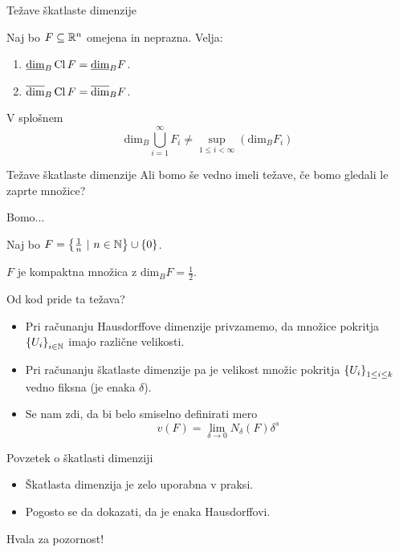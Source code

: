 \documentclass[10pt]{beamer}
\begin{document}
\begin{frame}[t]{Težave škatlaste dimenzije}
    \begin{trditev}
        Naj bo \(F \subseteq \mathbb{R}^n\) omejena in neprazna. Velja:
        \begin{enumerate}
            \item \(\underline{\text{dim}}_B \operatorname{Cl} F = \underline{\text{dim}}_B F\).
            \item \(\overline{\text{dim}}_B \operatorname{Cl} F = \overline{\text{dim}}_B F\).
        \end{enumerate}
    \end{trditev}

    \pause
    \begin{posledica}
        V splošnem 
        \[\text{dim}_B \bigcup_{i=1}^\infty F_i \neq \sup_{1 \leq i < \infty} (\text{dim}_B F_i)\]
    \end{posledica}
\end{frame}

\begin{frame}[t]{Težave škatlaste dimenzije}
    Ali bomo še vedno imeli težave, če bomo gledali le zaprte množice?
    \pause

     { Bomo... }
    
    \pause
    \begin{primer}
        Naj bo \(F = \left\{\frac{1}{n} \ | \ n \in \mathbb{N}\right\} \cup \left\{0\right\}\). 
        
        \(F\) je kompaktna množica z \(\text{dim}_B F = \frac{1}{2}\).
    \end{primer}
\end{frame}

\begin{frame}[t]{Od kod pride ta težava?}
    \begin{opomba}
        \begin{itemize}
            \item Pri računanju Hausdorffove dimenzije privzamemo, da množice pokritja \(\left\{U_i\right\}_{i \in \mathbb{N}}\) imajo različne velikosti.
            \item Pri računanju škatlaste dimenzije pa je velikost množic pokritja \(\left\{U_i\right\}_{1 \leq i \leq k}\) vedno fiksna (je enaka \(\delta\)).
            \pause
            \item Se nam zdi, da bi belo smiselno definirati mero 
            \[v(F) = \lim_{\delta \to 0} N_\delta(F) \delta^s\]
        \end{itemize}
    \end{opomba}
\end{frame}

\begin{frame}[t]{Povzetek o škatlasti dimenziji}
    \begin{itemize}
        \item Škatlasta dimenzija je zelo uporabna v praksi.
        \item Pogosto se da dokazati, da je enaka Hausdorffovi.
    \end{itemize}
\end{frame}

\begin{frame}
  \centering
  \Huge Hvala za pozornost!
\end{frame}
\end{document}
